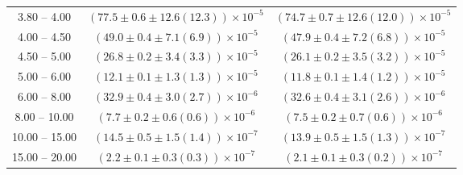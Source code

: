 \begin{table}
\begin{center}
\begin{tabular}{ c | c c }
3.80 -- 4.00 & $(77.5\pm0.6\pm12.6(12.3))\times10^{-5}$ & $(74.7\pm0.7\pm12.6(12.0))\times10^{-5}$ \\ 
4.00 -- 4.50 & $(49.0\pm0.4\pm7.1(6.9))\times10^{-5}$ & $(47.9\pm0.4\pm7.2(6.8))\times10^{-5}$ \\ 
4.50 -- 5.00 & $(26.8\pm0.2\pm3.4(3.3))\times10^{-5}$ & $(26.1\pm0.2\pm3.5(3.2))\times10^{-5}$ \\ 
5.00 -- 6.00 & $(12.1\pm0.1\pm1.3(1.3))\times10^{-5}$ & $(11.8\pm0.1\pm1.4(1.2))\times10^{-5}$ \\ 
6.00 -- 8.00 & $(32.9\pm0.4\pm3.0(2.7))\times10^{-6}$ & $(32.6\pm0.4\pm3.1(2.6))\times10^{-6}$ \\ 
8.00 -- 10.00 & $(7.7\pm0.2\pm0.6(0.6))\times10^{-6}$ & $(7.5\pm0.2\pm0.7(0.6))\times10^{-6}$ \\ 
10.00 -- 15.00 & $(14.5\pm0.5\pm1.5(1.4))\times10^{-7}$ & $(13.9\pm0.5\pm1.5(1.3))\times10^{-7}$ \\ 
15.00 -- 20.00 & $(2.2\pm0.1\pm0.3(0.3))\times10^{-7}$ & $(2.1\pm0.1\pm0.3(0.2))\times10^{-7}$ \\ 
\hline
\end{tabular}
\end{center}
\end{table}
 
